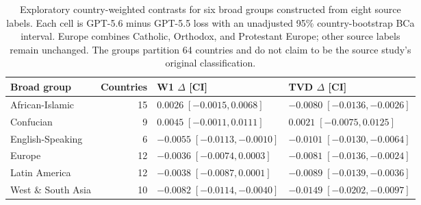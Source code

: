 \begin{table}[!htbp]
\centering
\caption{Exploratory country-weighted contrasts for six broad groups constructed
from eight source labels. Each cell is GPT-5.6 minus GPT-5.5 loss with an
unadjusted 95\% country-bootstrap BCa interval. Europe combines Catholic,
Orthodox, and Protestant Europe; other source labels remain unchanged.
The groups partition 64 countries and do not claim to be the source
study's original classification.}
\label{tab:six-regions}
\scriptsize
\setlength{\tabcolsep}{3pt}
\begin{tabular}{l r p{.30\linewidth} p{.30\linewidth}}
\toprule
\rowcolor{tablehead}
Broad group & Countries & W1 $\Delta$ [CI] & TVD $\Delta$ [CI] \\
\midrule
African-Islamic & 15 & $0.0026\;[-0.0015,0.0068]$ & $-0.0080\;[-0.0136,-0.0026]$ \\
Confucian & 9 & $0.0045\;[-0.0011,0.0111]$ & $0.0021\;[-0.0075,0.0125]$ \\
English-Speaking & 6 & $-0.0055\;[-0.0113,-0.0010]$ & $-0.0101\;[-0.0130,-0.0064]$ \\
Europe & 12 & $-0.0036\;[-0.0074,0.0003]$ & $-0.0081\;[-0.0136,-0.0024]$ \\
Latin America & 12 & $-0.0038\;[-0.0087,0.0001]$ & $-0.0089\;[-0.0139,-0.0036]$ \\
West \& South Asia & 10 & $-0.0082\;[-0.0114,-0.0040]$ & $-0.0149\;[-0.0202,-0.0097]$ \\
\bottomrule
\end{tabular}
\end{table}

